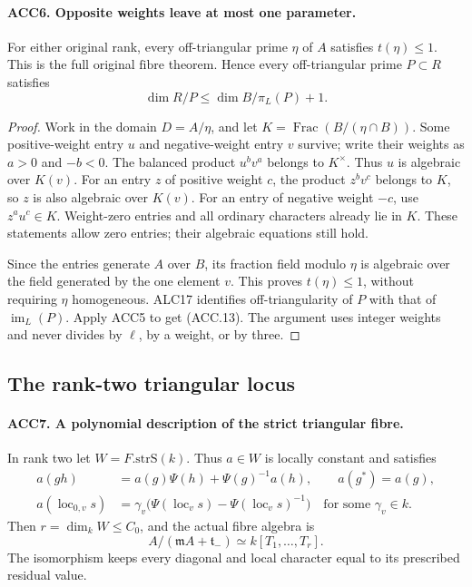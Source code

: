 \paragraph{ACC6. Opposite weights leave at most one parameter.}
\label{claim:ACC6}
For either original rank, every off-triangular prime \(\eta\) of
\(A\) satisfies \(t(\eta)\le1\).  This is the full original
\(\mathrm{fibre}\) theorem.  Hence every off-triangular prime
\(P\subset R\) satisfies
\[
                         \dim R/P\le\dim B/\pi_L(P)+1.
                                                               \tag{ACC.13}
\]

\begin{proof}
Work in the domain \(D=A/\eta\), and let
\(K=\operatorname{Frac}(B/(\eta\cap B))\).  Some positive-weight
entry \(u\) and negative-weight entry \(v\) survive; write their
weights as \(a>0\) and \(-b<0\).  The balanced product
\(u^b v^a\) belongs to \(K^\times\).  Thus \(u\) is algebraic
over \(K(v)\).  For an entry \(z\) of positive weight \(c\),
the product \(z^b v^c\) belongs to \(K\), so \(z\) is also
algebraic over \(K(v)\).  For an entry of negative weight
\(-c\), use \(z^a u^c\in K\).  Weight-zero entries and all
ordinary characters already lie in \(K\).  These statements allow
zero entries; their algebraic equations still hold.

Since the entries generate \(A\) over \(B\), its fraction field
modulo \(\eta\) is algebraic over the field generated by the one
element \(v\).  This proves \(t(\eta)\le1\), without requiring
\(\eta\) homogeneous.  ALC17 identifies off-triangularity of
\(P\) with that of \(\operatorname{im}_L(P)\).  Apply ACC5
to get (ACC.13).  The argument uses integer weights and never
divides by \(\ell\), by a weight, or by three.
\end{proof}

\subsection{The rank-two triangular locus}

\paragraph{ACC7. A polynomial description of the strict triangular fibre.}
\label{claim:ACC7}
In rank two let \(W=F.\mathrm{strS}(k)\).  Thus \(a\in W\)
is locally constant and satisfies
\[
 \begin{split}
 a(gh)&=a(g)\Psi(h)+\Psi(g)^{-1}a(h),\qquad a(g^*)=a(g),\\
 a(\operatorname{loc}_{0,v}s)
   &=\gamma_v\bigl(\Psi(\operatorname{loc}_v s)
                         -\Psi(\operatorname{loc}_v s)^{-1}\bigr)
                    \quad\text{for some }\gamma_v\in k.
 \end{split}                                                \tag{ACC.14}
\]
Then \(r=\dim_k W\le C_0\), and the actual fibre algebra is
\[
                   A/(\mathfrak m A+\mathfrak t_-)
                       \simeq k[T_1,\ldots,T_r].           \tag{ACC.15}
\]
The isomorphism keeps every diagonal and local character equal to
its prescribed residual value.

